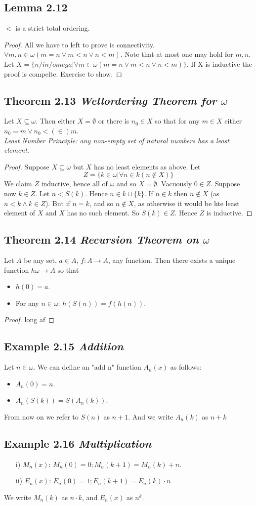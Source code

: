 \documentclass[a4paper, 12pt, twoside]{article}
\begin{document}
\subsection*{Lemma 2.12}
$<$ is a strict total ordering.
\begin{proof}
    All we have to left to prove is connectivity. $\forall m,n\in\omega(m=n\vee m<n \vee n<m)$. Note that at most one may hold for $m,n$. Let $X=\{n/in/omega|\forall m\in\omega(m=n\vee m<n \vee n<m)\}$. If X is inductive the proof is compelte. Exercise to show.
\end{proof}
\subsection*{Theorem 2.13 \emph{Wellordering Theorem for $\omega$}}
Let $X\subseteq\omega$. Then either  $X=\emptyset$ or there is $n_{0}\in X$ so that for any $m\in X$ either $n_{0}=m \vee n_{0}<(\in) m$.\\
\textit{Least Number Principle: any non-empty set of natural numbers has a least element.}
\begin{proof}
    Suppose $X\subseteq\omega$ but $X$ has no least elements as above. Let
    $$Z=\{k\in\omega|\forall n\in k(n\not\in X)\} $$
    We claim $Z$ inductive, hence all of $\omega$ and so $X=\emptyset$. Vacuously $0\in Z$. Suppose now $k\in Z$. Let $n<S(k)$. Hence $n\in k\cup\{k\}$. If $n\in k$ then $n\not\in X$ (as $n<k\wedge k\in Z$). But if $n=k$, and so $n\not\in X$, as otherwise it would be hte least element of $X$ and $X$ has no such element. So $S(k)\in Z$. Hence $Z$ is inductive.
\end{proof}
\subsection*{Theorem 2.14 \emph{Recursion Theorem on $\omega$}}
Let  $A$ be any set, $a\in A$, $f:A\to A$, any function. Then there exists a unique function $h\omega\to A$ so that
\begin{itemize}
    \item $h(0)=a$.
    \item For any $n\in\omega$: $h(S(n))=f(h(n))$.
\end{itemize}
\begin{proof}
long af
\end{proof}
\subsection*{Example 2.15 \emph{Addition}}
Let $n\in\omega$. We can define an "add n" function $A_{n}(x)$ as follows:
\begin{itemize}
    \item $A_{n}(0)=n$.
    \item $A_{n}(S(k))=S(A_{n}(k))$.
\end{itemize}
From now on we refer to $S(n)$ as $n+1$. And we write $A_{n}(k)$ as $n+k$
\subsection*{Example 2.16 \emph{Multiplication}}
\begin{itemize}
    \item[i)] $M_{n}(x)$: $M_{n}(0)=0; M_{n}(k+1)=M_{n}(k)+n$.
    \item[ii)] $E_{n}(x)$: $E_{n}(0)=1; E_{n}(k+1)=E_{n}(k)\cdot n$
\end{itemize}
We write $M_{n}(k)$ as $n\cdot k$, and $E_{n}(x)$ as $n^{k}$.
\end{document}
